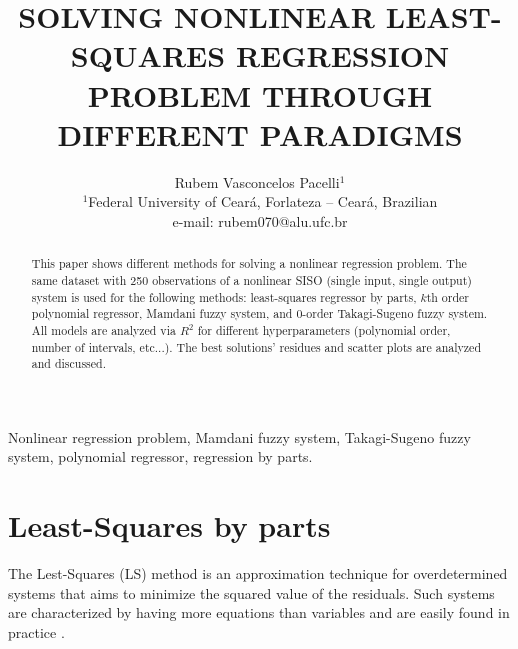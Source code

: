 \documentclass[english]{sobraep}
\title{SOLVING NONLINEAR LEAST-SQUARES REGRESSION PROBLEM THROUGH DIFFERENT PARADIGMS}
\author{Rubem Vasconcelos Pacelli$^{1}$\\
	\normalsize $^{1}$Federal University of Ceará, Forlateza -- Ceará, Brazilian\\
	\normalsize e-mail: rubem070@alu.ufc.br
}
\begin{document}
\maketitle

\begin{abstract}
	This paper shows different methods for solving a nonlinear regression problem. The same dataset with 250 observations of a nonlinear SISO (single input, single output) system is used for the following methods: least-squares regressor by parts, $k$th order polynomial regressor, Mamdani fuzzy system, and 0-order Takagi-Sugeno fuzzy system. All models are analyzed via $R^2$ for different hyperparameters (polynomial order, number of intervals, etc...). The best solutions' residues and scatter plots are analyzed and discussed.
\end{abstract}

\begin{keywords}
	Nonlinear regression problem, Mamdani fuzzy system, Takagi-Sugeno fuzzy system, polynomial regressor, regression by parts. 
\end{keywords}






\section{Least-Squares by parts}

The Lest-Squares (LS) method is an approximation technique for overdetermined systems that aims to minimize the squared value of the residuals. Such systems are characterized by having more equations than variables and are easily found in practice \cite{kay1993fundamentals}.
\end{document}
